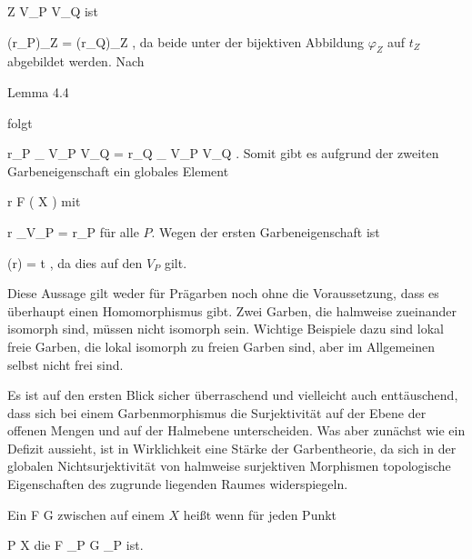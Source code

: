 {\mavergleichskettedisp
{\vergleichskette
{Z
}
{ \in} { V_P \cap V_Q
}
{ } {
}
{ } {
}
{ } {
}
}
{}{}{}
ist

\mavergleichskette
{\vergleichskette
{(r_P)_Z
}
{ = }{(r_Q)_Z
}
{  }{
}
{    }{
}
{   }{
}
}
{}{}{,}
da beide unter der bijektiven Abbildung $\varphi_Z$  auf $t_Z$ abgebildet werden. Nach

Lemma 4.4

folgt

\mavergleichskettedisp
{\vergleichskette
{ r_P \vert_{ V_P \cap V_Q }
}
{ =} { r_Q \vert_{ V_P \cap V_Q }
}
{ } {
}
{ } {
}
{ } {
}
}
{}{}{.}
Somit gibt es aufgrund der zweiten Garbeneigenschaft ein globales Element

\mavergleichskette
{\vergleichskette
{r
}
{ \in }{ { \mathcal  F   }  \left(   X   \right)
}
{  }{
}
{    }{
}
{   }{
}
}
{}{}{}
mit

\mavergleichskettedisp
{\vergleichskette
{r \vert_{V_P }
}
{ =} { r_P
}
{ } {
}
{ } {
}
{ } {
}
}
{}{}{}
für alle $P$. Wegen der ersten Garbeneigenschaft ist

\mavergleichskette
{\vergleichskette
{\varphi(r)
}
{ = }{t
}
{  }{
}
{    }{
}
{   }{
}
}
{}{}{,}
da dies auf den $V_P$ gilt.




}



Diese Aussage gilt weder für Prägarben
 {} {}
noch ohne die Voraussetzung, dass es überhaupt einen Homomorphismus gibt. Zwei Garben, die halmweise zueinander isomorph sind, müssen nicht isomorph sein. Wichtige Beispiele dazu sind lokal freie Garben, die lokal isomorph zu freien Garben sind, aber im Allgemeinen selbst nicht frei sind.

Es ist auf den ersten Blick sicher überraschend und vielleicht auch enttäuschend, dass sich bei einem Garbenmorphismus die Surjektivität auf der Ebene der offenen Mengen und auf der Halmebene unterscheiden. Was aber zunächst wie ein Defizit aussieht, ist in Wirklichkeit eine Stärke der Garbentheorie, da sich in der globalen Nichtsurjektivität von halmweise surjektiven Morphismen topologische Eigenschaften des zugrunde liegenden Raumes widerspiegeln.


{}
{





Ein
\maabb {\varphi} { { \mathcal  F   } } { { \mathcal  G   }
} {}
zwischen
auf einem
$X$ heißt
wenn für jeden Punkt

\mavergleichskette
{\vergleichskette
{P
}
{ \in }{ X
}
{  }{
}
{    }{
}
{   }{
}
}
{}{}{}
die
 { { \mathcal  F   }_P } { { \mathcal  G   }_P
} {}
ist.





}

